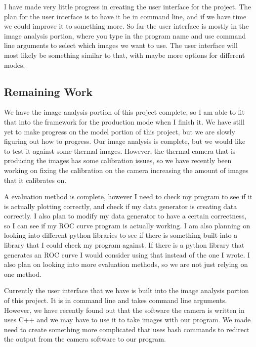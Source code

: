 \documentclass[onecolumn, draftclsnofoot,10pt, compsoc]{IEEEtran}
\begin{document}
I have made very little progress in creating the user interface for the project. The plan for the user interface is to have it be in command line, and if we have time we could improve it to something more. So far the user interface is mostly in the image analysis portion, where you type in the program name and use command line arguments to select which images we want to use. The user interface will most likely be something similar to that, with maybe more options for different modes.

\subsection{Remaining Work}
We have the image analysis portion of this project complete, so I am able to fit that into the framework for the production mode when I finish it. We have still yet to make progress on the model portion of this project, but we are slowly figuring out how to progress. Our image analysis is complete, but we would like to test it against some thermal images. However, the thermal camera that is producing the images has some calibration issues, so we have recently been working on fixing the calibration on the camera increasing the amount of images that it calibrates on.

A evaluation method is complete, however I need to check my program to see if it is actually plotting correctly, and check if my data generator is creating data correctly. I also plan to modify my data generator to have a certain correctness, so I can see if my ROC curve program is actually working. I am also planning on looking into different python libraries to see if there is something built into a library that I could check my program against. If there is a python library that generates an ROC curve I would consider using that instead of the one I wrote. I also plan on looking into more evaluation methods, so we are not just relying on one method.

Currently the user interface that we have is built into the image analysis portion of this project. It is in command line and takes command line arguments. However, we have recently found out that the software the camera is written in uses C++ and we may have to use it to take images with our program. We made need to create something more complicated that uses bash commands to redirect the output from the camera software to our program.
\end{document}
